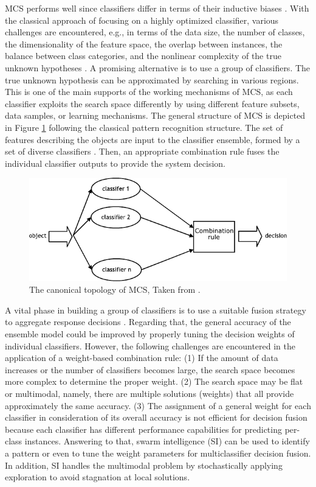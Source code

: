 MCS performs well since classifiers differ in terms of their inductive biases \cite{geman1992}. With the classical approach of focusing on a highly optimized classifier, various challenges are encountered, e.g., in terms of the data size, the number of classes, the dimensionality of the feature space, the overlap between instances, the balance between class categories, and the nonlinear complexity of the true unknown hypotheses \cite{zhou2012}. A promising alternative is to use a group of classifiers. The true unknown hypothesis can be approximated by searching in various regions. This is one of the main supports of the working mechanisms of MCS, as each classifier exploits the search space differently by using different feature subsets, data samples, or learning mechanisms. The general structure of MCS is depicted in Figure \ref{ch1:MCS-topology} following the classical pattern recognition structure. The set of features describing the objects are input to the classifier ensemble, formed by a set of diverse classifiers \cite{wozniak2014}. Then, an appropriate combination rule fuses the individual classifier outputs to provide the system decision. 


\begin{figure}[!ht]
    \centering
    \includegraphics[width=.9\textwidth]{1_introduction/figures/Ch1_MCS-topology.pdf}
    \caption{The canonical topology of MCS, Taken from \cite{wozniak2014}.}
    \label{ch1:MCS-topology}
\end{figure}






A vital phase in building a group of classifiers is to use a suitable fusion strategy to aggregate response decisions \cite{zhou2012,kuncheva2014}. Regarding that, the general accuracy of the ensemble model could be improved by properly tuning the decision weights of individual classifiers. However, the following challenges are encountered in the application of a weight-based combination rule: (1) If the amount of data increases or the number of classifiers becomes large, the search space becomes more complex to determine the proper weight. (2) The search space may be flat or multimodal, namely, there are multiple solutions (weights) that all provide approximately the same accuracy. (3) The assignment of a general weight for each classifier in consideration of its overall accuracy is not efficient for decision fusion because each classifier has different performance capabilities for predicting per-class instances. Answering to that, swarm intelligence (SI)  can be used to identify a pattern or even to tune the weight parameters for multiclassifier decision fusion. In addition, SI handles the multimodal problem by stochastically applying exploration to avoid stagnation at local solutions. 

